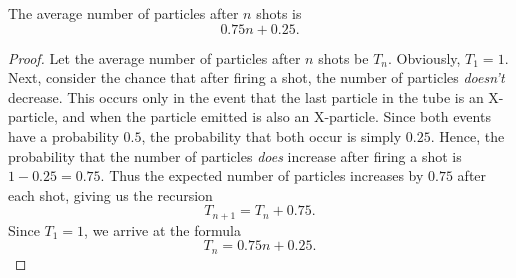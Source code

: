 \begin{theorem}\label{thm:2}
  The average number of particles after $n$ shots is \[
  0.75n + 0.25
  .\]
\end{theorem}
\begin{proof}
  Let the average number of particles after $n$ shots be $T_n$. Obviously, $T_1 = 1$. Next, consider the chance that after firing a shot, the number of particles \emph{doesn't} decrease. This occurs only in the event that the last particle in the tube is an X-particle, and when the particle emitted is also an X-particle. Since both events have a probability $0.5$, the probability that both occur is simply $0.25$. Hence, the probability that the number of particles \emph{does} increase after firing a shot is $1 - 0.25 = 0.75$. Thus the expected number of particles increases by $0.75$ after each shot, giving us the recursion \[
    T_{n+1} = T_{n} + 0.75
  .\] Since $T_1 = 1$, we arrive at the formula \[
    T_{n} = 0.75n + 0.25 \tag*{\qedhere}
  .\] 
\end{proof}

